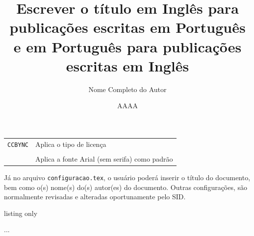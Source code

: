 \begin{table}[H]
\begin{tabular}{p{5cm}p{8cm}}
    \\[-0.5em]
    {\tt CCBYNC}                                & Aplica o tipo de licença \\
    \\[-0.5em]
    \texttt{\renewcommand{\rmdefault}{phv}}& Aplica a fonte Arial (sem serifa) como padrão \\
    \hline
    \end{tabular}
\end{table}


Já no arquivo {\tt configuracao.tex}, o usuário poderá inserir o título do documento, bem como o(s) nome(s) do(s) autor(es) do documento. Outras configurações, são normalmente revisadas e alteradas oportunamente pelo SID.

\begin{texexp}{listing only}
\title{Escrever o t\'{i}tulo em Ingl\^{e}s para publicaç\~{o}es escritas em Portugu\^{e}s e em Portugu\^{e}s para publicaç\~{o}es escritas em Ingl\^{e}s} 
\author{Nome Completo do Autor}
\date{AAAA}
...
\end{texexp}

